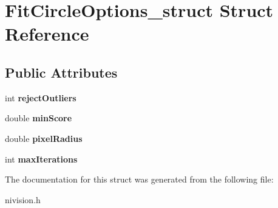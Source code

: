\hypertarget{structFitCircleOptions__struct}{
\section{FitCircleOptions\_\-struct Struct Reference}
\label{structFitCircleOptions__struct}
}
\subsection*{Public Attributes}
\begin{DoxyCompactItemize}
\item 
\hypertarget{structFitCircleOptions__struct_a3b00fc37ddf07ea961ff7cbf870389bb}{
int {\bfseries rejectOutliers}}
\label{structFitCircleOptions__struct_a3b00fc37ddf07ea961ff7cbf870389bb}

\item 
\hypertarget{structFitCircleOptions__struct_adc5b54684c45af2beb0571dcf3d54412}{
double {\bfseries minScore}}
\label{structFitCircleOptions__struct_adc5b54684c45af2beb0571dcf3d54412}

\item 
\hypertarget{structFitCircleOptions__struct_a4111915563a8d163fd6cb485fa89c78e}{
double {\bfseries pixelRadius}}
\label{structFitCircleOptions__struct_a4111915563a8d163fd6cb485fa89c78e}

\item 
\hypertarget{structFitCircleOptions__struct_a91648f278732196069603ba0cc803dad}{
int {\bfseries maxIterations}}
\label{structFitCircleOptions__struct_a91648f278732196069603ba0cc803dad}

\end{DoxyCompactItemize}


The documentation for this struct was generated from the following file:\begin{DoxyCompactItemize}
\item 
nivision.h\end{DoxyCompactItemize}

